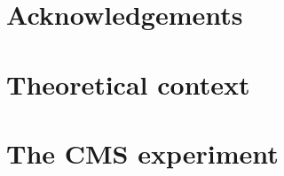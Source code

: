 \documentclass[12pt,twoside]{report}
\begin{document}

    


    \chapter*{Acknowledgements}

    {\hypersetup{linkcolor=black}
        \tableofcontents
        \listoffigures
        \listoftables
    }
        {\hypersetup{linkcolor=mycolor}}
    
%     
     
    \chapter{Theoretical context}
    \label{sec:TheoryChapter}
    

    \chapter{The CMS experiment}
    \label{sec:CMSchapter}
    
    
%     
    
%     
    
\end{document}
